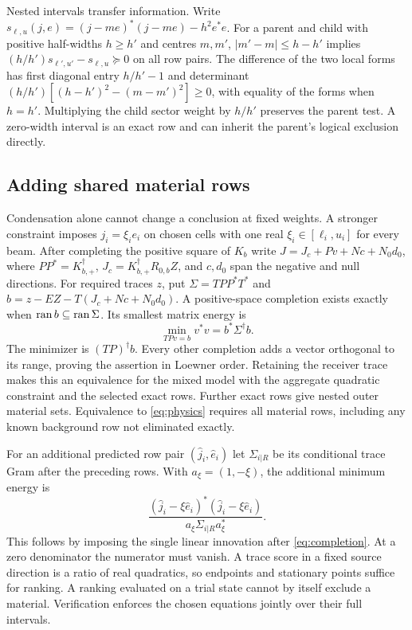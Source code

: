 Nested intervals transfer information. Write $s_{\ell,u}(j,e)=(j-me)^*(j-me)-h^2e^*e$. For a parent and child with positive half-widths $h\geq h'$ and centres $m,m'$, $\lvert m'-m\rvert\leq h-h'$ implies
$(h/h')s_{\ell',u'}-s_{\ell,u}\succeq0$ on all row pairs. The difference of the two local forms has first diagonal entry $h/h'-1$ and determinant $(h/h')[(h-h')^2-(m-m')^2]\geq0$, with equality of the forms when $h=h'$. Multiplying the child sector weight by $h/h'$ preserves the parent test. A zero-width interval is an exact row and can inherit the parent's logical exclusion directly.

\subsection{Adding shared material rows}
Condensation alone cannot change a conclusion at fixed weights. A stronger constraint imposes $j_i=\xi_i e_i$ on chosen cells with one real $\xi_i\in[\ell_i,u_i]$ for every beam. After completing the positive square of $K_b$ write $J=J_c+P v+N c+N_0 d_0$, where $PP^*=K_{b,+}^{\dagger}$, $J_c=K_{b,+}^{\dagger}R_{0,b} Z$, and $c,d_0$ span the negative and null directions. For required traces $z$, put $\Sigma=TPP^*T^*$ and $b=z-EZ-T(J_c+Nc+N_0d_0)$. A positive-space completion exists exactly when $\operatorname{ran} b\subseteq\operatorname{ran}\Sigma$. Its smallest matrix energy is
\begin{equation}
 \min_{TPv=b}v^*v=b^*\Sigma^\dagger b .
 \label{eq:completion}
\end{equation}
The minimizer is $(TP)^\dagger b$. Every other completion adds a vector orthogonal to its range, proving the assertion in Loewner order. Retaining the receiver trace makes this an equivalence for the mixed model with the aggregate quadratic constraint and the selected exact rows. Further exact rows give nested outer material sets. Equivalence to \eqref{eq:physics} requires all material rows, including any known background row not eliminated exactly.

For an additional predicted row pair $(\widehat j_i,\widehat e_i)$ let $\Sigma_{i|R}$ be its conditional trace Gram after the preceding rows. With $a_\xi=(1,-\xi)$, the additional minimum energy is
\begin{equation}
 \frac{(\widehat j_i-\xi\widehat e_i)^*(\widehat j_i-\xi\widehat e_i)}
 {a_\xi\Sigma_{i|R}a_\xi^*}.
 \label{eq:innovation}
\end{equation}
This follows by imposing the single linear innovation after \eqref{eq:completion}. At a zero denominator the numerator must vanish. A trace score in a fixed source direction is a ratio of real quadratics, so endpoints and stationary points suffice for ranking. A ranking evaluated on a trial state cannot by itself exclude a material. Verification enforces the chosen equations jointly over their full intervals.

